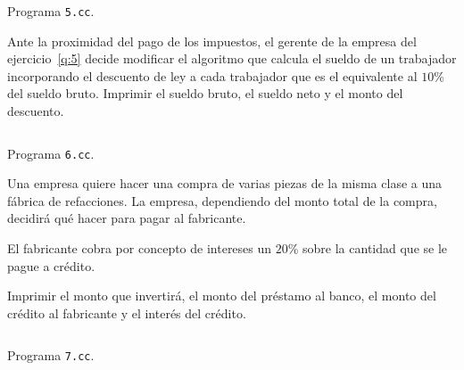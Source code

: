 \documentclass[spanish,addpoints,answers,a4paper]{exam}
\begin{document}
\begin{questions}
\begin{solution}
	\begin{listing}[H]
		\footnotesize
		\inputminted{cpp}{5.cc}
		\caption{Programa \texttt{5.cc}.}
		\label{lst:1.5}
	\end{listing}
\end{solution}

\question Ante la proximidad del pago de los impuestos, el gerente de la empresa del ejercicio~\ref{q:5} decide modificar el algoritmo que calcula el sueldo de un trabajador incorporando el descuento de ley a cada trabajador que es el equivalente al $10$\% del sueldo bruto. Imprimir el sueldo bruto, el sueldo neto y el monto del descuento.

\begin{solution}
	\begin{listing}[H]
		\footnotesize
		\inputminted{cpp}{6.cc}
		\caption{Programa \texttt{6.cc}.}
		\label{lst:1.6}
	\end{listing}
\end{solution}

\question Una empresa quiere hacer una compra de varias piezas de la misma clase a una fábrica de refacciones. La empresa, dependiendo del monto total de la compra, decidirá qué hacer para pagar al fabricante.


El fabricante cobra por concepto de intereses un $20$\% sobre la cantidad que se le pague a crédito.

Imprimir el monto que invertirá, el monto del préstamo al banco, el monto del crédito al fabricante y el interés del crédito.

\begin{solution}
		\begin{listing}[H]
		\footnotesize
		\inputminted{cpp}{7.cc}
		\caption{Programa \texttt{7.cc}.}
		\label{lst:1.7}
	\end{listing}
\end{solution}

\end{questions}
\end{document}
